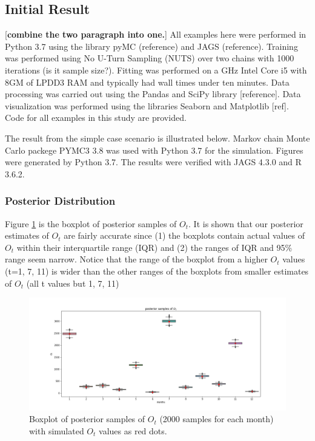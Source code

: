\documentclass[12pt]{article}
\begin{document}
\subsection{Initial Result} 

[\textbf{combine the two paragraph into one.}]
All examples here were performed in Python 3.7 using the library pyMC (reference) and JAGS (reference). Training was performed using No U-Turn Sampling (NUTS) over two chains with 1000 iterations (is it sample size?). Fitting was performed on a GHz Intel Core i5 with 8GM of LPDD3 RAM and typically had wall times under ten minutes. Data processing was carried out using the Pandas and SciPy library [reference]. Data visualization was performed using the libraries Seaborn and Matplotlib [ref]. Code for all examples in this study are provided. 

The result from the simple case scenario is illustrated below. Markov chain Monte Carlo packege PYMC3 3.8\cite{pymc3} was used  with Python 3.7 for the simulation. Figures were generated by Python 3.7. The results were verified with JAGS 4.3.0 and R 3.6.2.

\subsubsection{Posterior Distribution}


Figure \ref{pst_ot} is the boxplot of posterior samples of $O_t$. It is shown that our posterior estimates of  $O_t$ are fairly accurate since (1) the boxplots contain actual values of $O_t$ within their interquartile range (IQR) and (2) the ranges of IQR and 95\% range seem narrow. Notice that the range of the boxplot from a higher $O_t$ values (t=1, 7, 11) is wider than the other ranges of the boxplots from smaller estimates of $O_t$ (all t values but 1, 7, 11)\\

\begin{figure}[h]
	\centering
	\includegraphics[width=1\linewidth]{Figures/earlyresult1_ot.png}
	\caption{Boxplot of posterior samples of $O_t$ (2000 samples for each month) with simulated $O_t$ values as red dots.}
	\label{pst_ot}
\end{figure}
\end{document}
